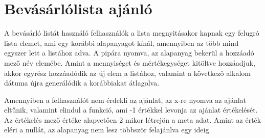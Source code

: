 \documentclass[12pt]{report}
\theoremstyle{definition}
\begin{document}
\section{Bevásárlólista ajánló}
A bevásárló listát használó felhasználók a lista megnyitásakor kapnak egy felugró lista elemet, ami egy korábbi alapanyagot kínál, amennyiben az több mind egyszer lett a listához adva. A pipára nyomva, az alapanyag bekerül a hozzáadó mező név elemébe. Amint a mennyiséget és mértékegységet kitöltve hozzáadjuk, akkor egyrész hozzáadódik az új elem a listához, valamint a következő alkalom dátuma újra generálódik a korábbiakat átlagolva.

Amennyiben a felhasználót nem érdekli az ajánlat, az x-re nyomva az ajánlat eltűnik, valamint elindul a funkció, ami -1 értékkel levonja az ajánlat értékelését. Az értékelés mező értéke alapvetően 2 mikor létrejön a meta adat. Amint az érték eléri a nullát, az alapanyag nem lesz többször felajánlva egy ideig.
\end{document}

